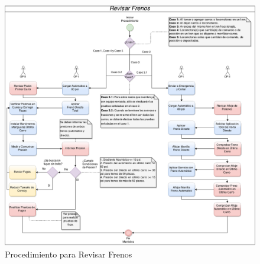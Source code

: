 \documentclass[oneside,12pt, letterpaper, titlepage]{book}
\begin{document}
\begin{appendices}
\begin{figure}[H]
    \centering
    \includegraphics[scale=0.4]{./images/MRF}
    \caption{Procedimiento para Revisar Frenos}
    \label{fig:MRF}
\end{figure}


\end{appendices}
\end{document}
